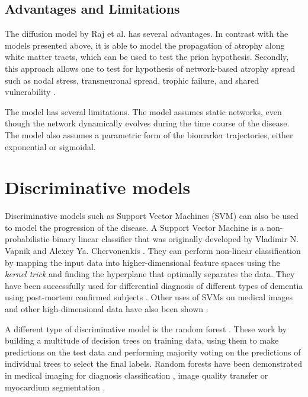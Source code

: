 \subsection{Advantages and Limitations}

The diffusion model by Raj et al. \cite{raj2012network} has several advantages. In contrast with the models presented above, it is able to model the propagation of atrophy along white matter tracts, which can be used to test the prion hypothesis. Secondly, this approach allows one to test for hypothesis of network-based atrophy spread such as nodal stress, transneuronal spread, trophic failure, and shared vulnerability \cite{zhou2012predicting}.

The model has several limitations. The model assumes static networks, even though the network dynamically evolves during the time course of the disease. The model also assumes a parametric form of the biomarker trajectories, either exponential or sigmoidal.  

\section{Discriminative models}
\label{sec:backgr_svm}

Discriminative models such as Support Vector Machines (SVM) can also be used to model the progression of the disease. A Support Vector Machine is a non-probabilistic binary linear classifier that was originally developed by Vladimir N. Vapnik and Alexey Ya. Chervonenkis \cite{vapnik2006estimation}. They can perform non-linear classification by mapping the input data into higher-dimensional feature spaces using the \emph{kernel trick} and finding the hyperplane that optimally separates the data. They have been successfully used for differential diagnosis of different types of dementia using post-mortem confirmed subjects \cite{kloppel2008automatic}. Other uses of SVMs on medical images and other high-dimensional data have also been shown \cite{lao2004morphological,fan2005classification,mourao2005classifying,kawasaki2007multivariate}.

A different type of discriminative model is the random forest \cite{ho1995random,breiman2001random}. These work by building a multitude of decision trees on training data, using them to make predictions on the test data and performing majority voting on the predictions of individual trees to select the final labels. Random forests have been demonstrated in medical imaging for diagnosis classification \cite{gray2013random}, image quality transfer \cite{alexander2014image} or myocardium segmentation \cite{lempitsky2009random}. 

